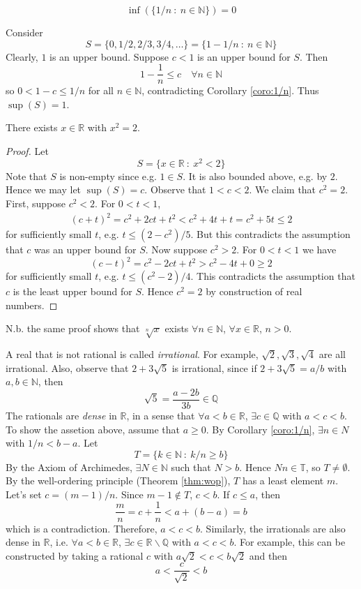 \documentclass[10pt, a4paper, twoside]{report}
\begin{document}
\[\inf(\{1/n\::\:n\in\mathbb{N}\})=0\]
\begin{example}
    Consider 
    \[S=\{0,1/2,2/3,3/4,\ldots\}=\{1-1/n\::\:n\in\mathbb{N}\}\]
    Clearly, \(1\) is an upper bound. Suppose \(c<1\) is an upper bound for \(S\). Then 
    \[1-\frac 1n\leq c\quad\forall n\in\mathbb{N}\]
    so \(0<1-c\leq 1/n\) for all \(n\in\mathbb{N}\), contradicting Corollary \ref{coro:1/n}. Thus \(\sup(S)=1\).
\end{example}
\begin{theorem}
    There exists \(x\in\mathbb{R}\) with \(x^2=2\).
\end{theorem}
\begin{proof}
    Let 
    \[S=\{x\in\mathbb{R}\::\:x^2<2\}\]
    Note that \(S\) is non-empty since e.g. \(1\in S\). It is also bounded above, e.g. by \(2\). Hence we may let \(\sup(S)=c\). Observe that \(1<c<2\). We claim that \(c^2=2\). First, suppose \(c^2<2\). For \(0<t<1\),
    \begin{align*}
        (c+t)^2=c^2+2ct+t^2<c^2+4t+t=c^2+5t\leq 2
    \end{align*}
    for sufficiently small \(t\), e.g. \(t\leq (2-c^2)/5\). But this contradicts the assumption that \(c\) was an upper bound for \(S\). Now suppose \(c^2>2\). For \(0<t<1\) we have
    \[(c-t)^2=c^2-2ct+t^2>c^2-4t+0\geq 2\]
    for sufficiently small \(t\), e.g. \(t\leq(c^2-2)/4\). This contradicts the assumption that \(c\) is the least upper bound for \(S\). Hence \(c^2=2\) by construction of real numbers.
\end{proof}
N.b. the same proof shows that \(\sqrt[n]{x}\) exists \(\forall n\in\mathbb{N}\), \(\forall x\in\mathbb{R}\), \(n>0\).

A real that is not rational is called \emph{irrational}. For example, \(\sqrt{2},\sqrt{3},\sqrt{4}\) are all irrational. Also, observe that \(2+3\sqrt{5}\) is irrational, since if \(2+3\sqrt{5}=a/b\) with \(a,b\in\mathbb{N}\), then 
\[\sqrt{5}=\frac{a-2b}{3b}\in\mathbb{Q}\]
The rationals are \emph{dense} in \(\mathbb{R}\), in a sense that \(\forall a<b\in\mathbb{R}\), \(\exists c\in\mathbb{Q}\) with \(a<c<b\). To show the assetion above, assume that \(a\geq 0\). By Corollary \ref{coro:1/n}, \(\exists n\in N\) with \(1/n<b-a\). Let 
\[T=\{k\in\mathbb{N}\::\:k/n\geq b\}\]
By the Axiom of Archimedes, \(\exists N\in\mathbb{N}\) such that \(N>b\). Hence \(Nn\in\mathbb{T}\), so \(T\neq\emptyset\). By the well-ordering principle (Theorem \ref{thm:wop}), \(T\) has a least element \(m\). Let's set \(c=(m-1)/n\). Since \(m-1\notin T\), \(c<b\). If \(c\leq a\), then 
\[\frac mn=c+\frac 1n<a+(b-a)=b\]
which is a contradiction. Therefore, \(a<c<b\). Similarly, the irrationals are also dense in \(\mathbb{R}\), i.e. \(\forall a<b\in\mathbb{R}\), \(\exists c\in\mathbb{R}\backslash\mathbb{Q}\) with \(a<c<b\). For example, this can be constructed by taking a rational \(c\) with \(a\sqrt{2}<c<b\sqrt{2}\) and then
\[a<\frac{c}{\sqrt{2}}<b\]
\end{document}
